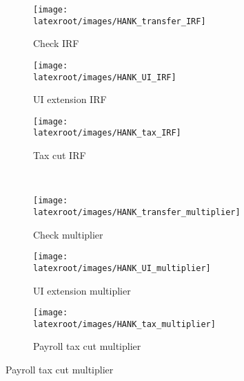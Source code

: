 \documentclass{econsocart}
\begin{document}
\begin{figure}[H]
  \centering
  \caption{General equilibrium policy comparison in HANK-SAM model}
  \label{fig:HANK_IRFs} 
  \noindent\begin{minipage}{\textwidth}
    \centering
    \begin{subfigure}[b]{.30\linewidth}
      \centering
      \texttt{[image: \\latexroot/images/HANK\_transfer\_IRF]}
      \caption{Check IRF}
      \label{fig:hank_stimulus_irf} 
    \end{subfigure}
    \begin{subfigure}[b]{.30\linewidth}
      \centering
      \texttt{[image: \\latexroot/images/HANK\_UI\_IRF]}
      \caption{UI extension IRF}
      \label{fig:hank_UI_irf} 
    \end{subfigure}
    \begin{subfigure}[b]{.30\linewidth}
      \centering
      \texttt{[image: \\latexroot/images/HANK\_tax\_IRF]}
      \caption{Tax cut IRF}
      \label{fig:hank_tax_irf} 
    \end{subfigure}
    \\[1em]
    \begin{subfigure}[b]{.30\linewidth}
      \centering
      \texttt{[image: \\latexroot/images/HANK\_transfer\_multiplier]}
      \caption{Check multiplier}
      \label{fig:HANK_transfer_multiplier} 
    \end{subfigure}
    \begin{subfigure}[b]{.30\linewidth}
      \centering
      \texttt{[image: \\latexroot/images/HANK\_UI\_multiplier]}
      \caption{UI extension multiplier}
      \label{fig:HANK_UI_multiplier} 
    \end{subfigure}
    \begin{subfigure}[b]{.30\linewidth}
      \centering
      \texttt{[image: \\latexroot/images/HANK\_tax\_multiplier]}
      \caption{Payroll tax cut multiplier}
      \label{fig:HANK_tax_multiplier} 
    \end{subfigure}
  \end{minipage}
\end{figure}
\end{document}
